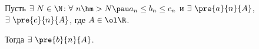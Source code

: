 
Пусть $\exists\  N\in\N\colon \forall\  n\hm>N
\pau a_n\leq b_n\leq c_n$ и $\exists\  \pre{a}{n}{A}$, $\exists\  \pre{c}{n}{A}$, где $A\in\ol\R$.

Тогда $\exists\  \pre{b}{n}{A}$.
